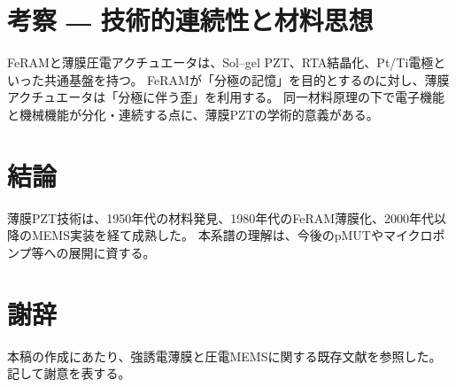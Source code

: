 \documentclass[conference]{IEEEtran}
\begin{document}
\section{考察 ― 技術的連続性と材料思想}
FeRAMと薄膜圧電アクチュエータは、Sol--gel PZT、RTA結晶化、Pt/Ti電極といった共通基盤を持つ。
FeRAMが「分極の記憶」を目的とするのに対し、薄膜アクチュエータは「分極に伴う歪」を利用する。
同一材料原理の下で電子機能と機械機能が分化・連続する点に、薄膜PZTの学術的意義がある\cite{scott2000review,damjanovic2010ferro}。

\section{結論}
薄膜PZT技術は、1950年代の材料発見、1980年代のFeRAM薄膜化、2000年代以降のMEMS実装を経て成熟した。
本系譜の理解は、今後のpMUTやマイクロポンプ等への展開に資する。

\section*{謝辞}
本稿の作成にあたり、強誘電薄膜と圧電MEMSに関する既存文献を参照した。記して謝意を表する。
\end{document}
